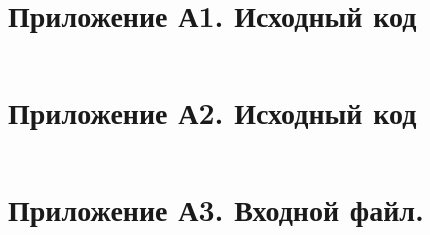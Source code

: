 \documentclass[oneside,a4paper,14pt]{extarticle}
\begin{document}
\newpage
\section*{Приложение А1. Исходный код}
\inputminted{rust}{src/main.rs}

\newpage
\section*{Приложение А2. Исходный код}
\inputminted{rust}{src/graphviz.rs}

\newpage
\section*{Приложение А3. Входной файл.}
\inputminted{text}{./input.txt}
\end{document}
